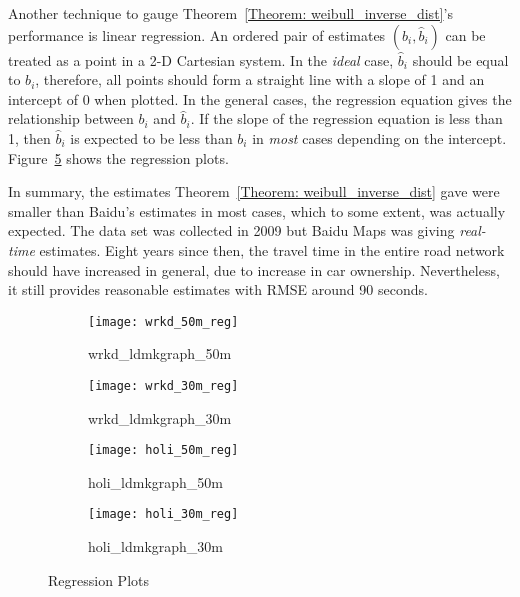 Another technique to gauge Theorem~\ref{Theorem: weibull_inverse_dist}'s performance is linear regression. An ordered pair of estimates $(b_{i}, \hat{b}_{i})$ can be treated as a point in a 2-D Cartesian system. In the \emph{ideal} case, $\hat{b}_{i}$ should be equal to $b_{i}$, therefore, all points should form a straight line with a slope of 1 and an intercept of 0 when plotted. In the general cases, the regression equation gives the relationship between $b_{i}$ and $\hat{b}_{i}$. If the slope of the regression equation is less than 1, then $\hat{b}_{i}$ is expected to be less than $b_{i}$ in \emph{most} cases depending on the intercept. Figure~\ref{Fig:regression_plot} shows the regression plots. 

In summary, the estimates Theorem~\ref{Theorem: weibull_inverse_dist} gave were smaller than Baidu's estimates in most cases, which to some extent, was actually expected. The data set was collected in 2009 but Baidu Maps was giving \emph{real-time} estimates. Eight years since then, the travel time in the entire road network should have increased in general, due to increase in car ownership. Nevertheless, it still provides reasonable estimates with RMSE around 90 seconds. 

\begin{figure}[h!]
\begin{subfigure}{.5\textwidth}
\centering
\texttt{[image: wrkd\_50m\_reg]}
\caption{wrkd\_ldmkgraph\_50m}
\label{Fig:wrkd_50m_reg}
\end{subfigure}
\begin{subfigure}{.5\textwidth}
\centering
\texttt{[image: wrkd\_30m\_reg]}
\caption{wrkd\_ldmkgraph\_30m}
\label{Fig:wrkd_30m_reg}
\end{subfigure}

\begin{subfigure}{.5\textwidth}
\centering
\texttt{[image: holi\_50m\_reg]}
\caption{holi\_ldmkgraph\_50m}
\label{Fig:holi_50m_reg}
\end{subfigure}
\begin{subfigure}{.5\textwidth}
\centering
\texttt{[image: holi\_30m\_reg]}
\caption{holi\_ldmkgraph\_30m}
\label{Fig:holi_30m_reg}
\end{subfigure}

\caption{Regression Plots}
\label{Fig:regression_plot}
\end{figure}